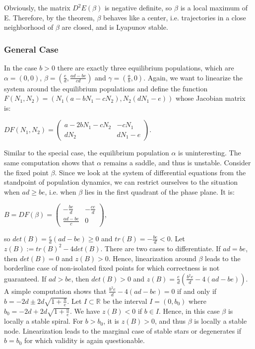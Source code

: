 \documentclass[11pt,a4paper]{scrartcl}
\theoremstyle{definition}
\begin{document}
Obviously, the matrix $D^2E(\beta)$ is negative definite, so $\beta$ is a local maximum of E. Therefore, by the theorem, $\beta$ behaves like a center, i.e. trajectories in a close neighborhood of $\beta$ are closed, and is Lyapunov stable.

\subsubsection{General Case}
In the case $b>0$ there are exactly three equilibrium populations, which are $\alpha=(0,0)$, $\beta=(\frac{e}{d},\frac{ad-be}{cd})$ and $\gamma=(\frac{a}{b},0)$. Again, we want to linearize the system around the equilibrium populations and define the function
$F(N_1, N_2)=(N_1(a-bN_1-cN_2), N_2(dN_1-e))$ whose Jacobian matrix is:

\begin{center}
$DF(N_1, N_2)=\begin{pmatrix}
	a-2bN_1-cN_2 & -cN_1 \\
	dN_2 & dN_1-e
\end{pmatrix}$.
\end{center}

Similar to the special case, the equilibrium population $\alpha$ is uninteresting. The same computation shows that $\alpha$ remains a saddle, and thus is unstable. Consider the fixed point $\beta$. Since we look at the system of differential equations from the standpoint of population dynamics, we can restrict ourselves to the situation when $ad \geqslant be$, i.e. when $\beta$ lies in the first quadrant of the phase plane. It is:

\begin{center}
$B=DF(\beta)=\begin{pmatrix}
	-\frac{be}{d} & -\frac{ce}{d} \\
	\frac{ad-be}{c} & 0
\end{pmatrix}$,
\end{center}

so $det(B)=\frac{e}{d}(ad-be)\geqslant 0$ and $tr(B)=-\frac{be}{d}<0$. Let $z(B):=tr(B)^2-4det(B)$. There are two cases to differentiate. 
If $ad=be$, then $det(B)=0$ and $z(B)>0$. Hence, linearization around $\beta$ leads to the borderline case of non-isolated fixed points for which correctness is not guaranteed. 
If $ad>be$, then $det(B)>0$ and $z(B)=\frac{e}{d}(\frac{b^2e}{d}-4(ad-be))$. A simple computation shows that 
$\frac{b^2e}{d}-4(ad-be)=0$ if and only if $b=-2d \pm 2d\sqrt{1+\frac{a}{e}}$. Let $I \subset \mathbb{R}$ be the interval 
$I=(0,b_0)$ where $b_0=-2d+2d\sqrt{1+\frac{a}{e}}$. We have $z(B)<0$ if $b \in I$. Hence, in this case $\beta$ is locally a stable spiral. For $b>b_0$, it is $z(B)>0$, and thus $\beta$ is locally a stable node. Linearization leads to the marginal case of stable stars or degenerates if $b=b_0$ for which validity is again questionable.
\newline
\end{document}
